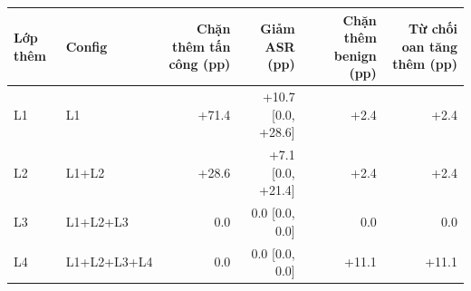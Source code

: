 \begin{tabular}{llrrrr}
\toprule
Lớp thêm & Config & Chặn thêm tấn công (pp) & Giảm ASR (pp) & Chặn thêm benign (pp) & Từ chối oan tăng thêm (pp) \\
\midrule
L1 & L1 & +71.4 & +10.7 [0.0, +28.6] & +2.4 & +2.4 \\
L2 & L1+L2 & +28.6 & +7.1 [0.0, +21.4] & +2.4 & +2.4 \\
L3 & L1+L2+L3 & 0.0 & 0.0 [0.0, 0.0] & 0.0 & 0.0 \\
L4 & L1+L2+L3+L4 & 0.0 & 0.0 [0.0, 0.0] & +11.1 & +11.1 \\
\bottomrule
\end{tabular}
